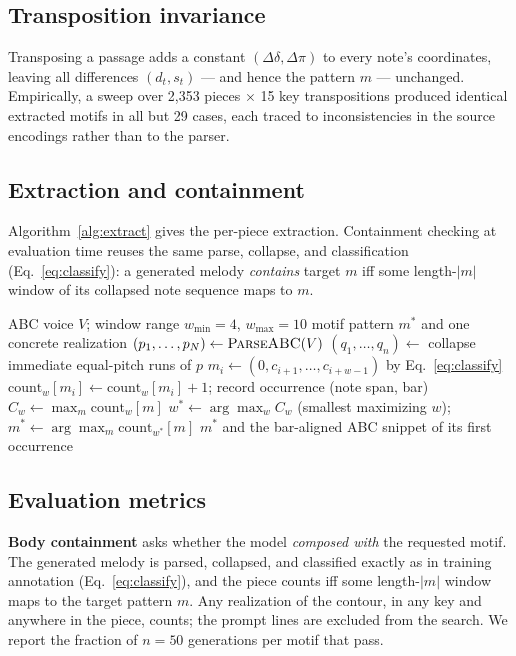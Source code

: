 \documentclass{article}
\begin{document}
\subsection*{Transposition invariance}
Transposing a passage adds a constant $(\Delta\delta, \Delta\pi)$ to every note's coordinates, leaving all differences $(d_t, s_t)$ --- and hence the pattern $m$ --- unchanged. Empirically, a sweep over 2{,}353 pieces $\times$ 15 key transpositions produced identical extracted motifs in all but 29 cases, each traced to inconsistencies in the source encodings rather than to the parser.

\subsection*{Extraction and containment}
Algorithm~\ref{alg:extract} gives the per-piece extraction. Containment checking at evaluation time reuses the same parse, collapse, and classification (Eq.~\ref{eq:classify}): a generated melody \emph{contains} target $m$ iff some length-$|m|$ window of its collapsed note sequence maps to $m$.

\begin{algorithm}[h]
  \caption{Per-piece motif extraction (window sweep 4--10, stride 1)}
  \label{alg:extract}
  \begin{algorithmic}[1]
    \Require ABC voice $V$; window range $w_{\min}{=}4$, $w_{\max}{=}10$
    \Ensure motif pattern $m^*$ and one concrete realization
    \State $(p_1,\dots,p_N) \gets \textsc{ParseABC}(V)$
    \State $(q_1,\dots,q_n) \gets$ collapse immediate equal-pitch runs of $p$
        \State $m_i \gets (0, c_{i+1}, \dots, c_{i+w-1})$ by
          Eq.~\ref{eq:classify}
        \State $\mathrm{count}_w[m_i] \gets \mathrm{count}_w[m_i] + 1$;
          record occurrence (note span, bar)
      \EndFor
      \State $C_w \gets \max_m \mathrm{count}_w[m]$
    \EndFor
    \State $w^* \gets \arg\max_w C_w$ (smallest maximizing $w$);\quad
      $m^* \gets \arg\max_m \mathrm{count}_{w^*}[m]$
    \State \Return $m^*$ and the bar-aligned ABC snippet of its first
      occurrence
  \end{algorithmic}
\end{algorithm}

\subsection*{Evaluation metrics}
\label{sec:eval}
\textbf{Body containment} asks whether the model \emph{composed with} the requested motif. The generated melody is parsed, collapsed, and classified exactly as in training annotation (Eq.~\ref{eq:classify}), and the piece counts iff some length-$|m|$ window maps to the target pattern $m$. Any realization of the contour, in any key and anywhere in the piece, counts; the prompt lines are excluded from the search. We report the fraction of $n{=}50$ generations per motif that pass.
\end{document}
